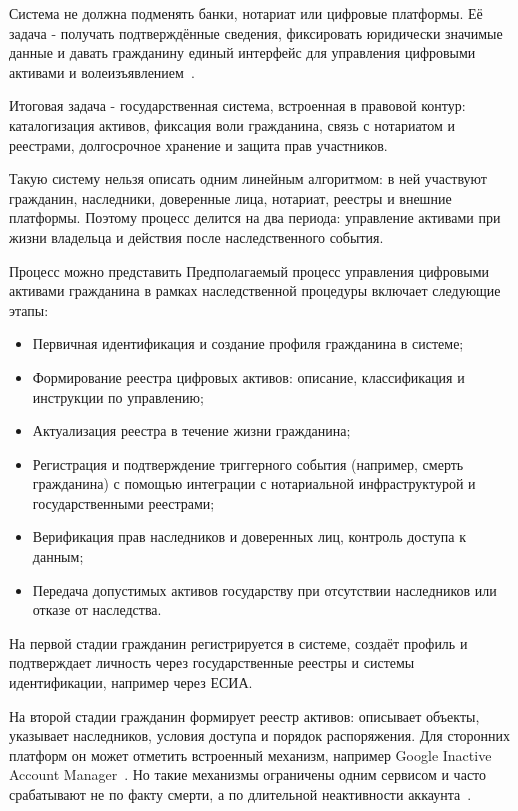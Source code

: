 Система не должна подменять банки, нотариат или цифровые платформы. Её задача - получать подтверждённые сведения, фиксировать юридически значимые данные и давать гражданину единый интерфейс для управления цифровыми активами и волеизъявлением~\cite{Haritonova2024HSE, RUFADAA2015, Harbinja2022DigitalDeath}.

Итоговая задача - государственная система, встроенная в правовой контур: каталогизация активов, фиксация воли гражданина, связь с нотариатом и реестрами, долгосрочное хранение и защита прав участников.

Такую систему нельзя описать одним линейным алгоритмом: в ней участвуют гражданин, наследники, доверенные лица, нотариат, реестры и внешние платформы. Поэтому процесс делится на два периода: управление активами при жизни владельца и действия после наследственного события.

Процесс можно представить Предполагаемый процесс управления цифровыми активами гражданина в рамках наследственной процедуры включает следующие этапы:

\begin{itemize}
  \item Первичная идентификация и создание профиля гражданина в системе;
  \item Формирование реестра цифровых активов: описание, классификация и инструкции по управлению;
  \item Актуализация реестра в течение жизни гражданина;
  \item Регистрация и подтверждение триггерного события (например, смерть гражданина) с помощью интеграции с нотариальной инфраструктурой и государственными реестрами;
  \item Верификация прав наследников и доверенных лиц, контроль доступа к данным;
  \item Передача допустимых активов государству при отсутствии наследников или отказе от наследства.
\end{itemize}

На первой стадии гражданин регистрируется в системе, создаёт профиль и подтверждает личность через государственные реестры и системы идентификации, например через ЕСИА.

На второй стадии гражданин формирует реестр активов: описывает объекты, указывает наследников, условия доступа и порядок распоряжения. Для сторонних платформ он может отметить встроенный механизм, например Google Inactive Account Manager~\cite{googleInactiveAccountManager, facebookLegacyContact, appleLegacyContact}. Но такие механизмы ограничены одним сервисом и часто срабатывают не по факту смерти, а по длительной неактивности аккаунта~\cite{googleInactiveAccountManager, Orlov2024Moluch}.

